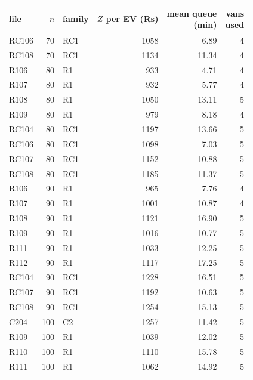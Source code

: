 \begin{tabular}{@{}lrlrrr@{}}
\toprule
file & $n$ & family & \shortstack[r]{$Z$ per EV\\(Rs)} & \shortstack[r]{mean queue\\(min)} & \shortstack[r]{vans\\used} \\
\midrule
RC106 & 70 & RC1 & 1058 & 6.89 & 4 \\
RC108 & 70 & RC1 & 1134 & 11.34 & 4 \\
R106 & 80 & R1 & 933 & 4.71 & 4 \\
R107 & 80 & R1 & 932 & 5.77 & 4 \\
R108 & 80 & R1 & 1050 & 13.11 & 5 \\
R109 & 80 & R1 & 979 & 8.18 & 4 \\
RC104 & 80 & RC1 & 1197 & 13.66 & 5 \\
RC106 & 80 & RC1 & 1098 & 7.03 & 5 \\
RC107 & 80 & RC1 & 1152 & 10.88 & 5 \\
RC108 & 80 & RC1 & 1185 & 11.37 & 5 \\
R106 & 90 & R1 & 965 & 7.76 & 4 \\
R107 & 90 & R1 & 1001 & 10.87 & 4 \\
R108 & 90 & R1 & 1121 & 16.90 & 5 \\
R109 & 90 & R1 & 1016 & 10.77 & 5 \\
R111 & 90 & R1 & 1033 & 12.25 & 5 \\
R112 & 90 & R1 & 1117 & 17.25 & 5 \\
RC104 & 90 & RC1 & 1228 & 16.51 & 5 \\
RC107 & 90 & RC1 & 1192 & 10.63 & 5 \\
RC108 & 90 & RC1 & 1254 & 15.13 & 5 \\
C204 & 100 & C2 & 1257 & 11.42 & 5 \\
R109 & 100 & R1 & 1039 & 12.02 & 5 \\
R110 & 100 & R1 & 1110 & 15.78 & 5 \\
R111 & 100 & R1 & 1062 & 14.92 & 5 \\
\bottomrule
\end{tabular}
